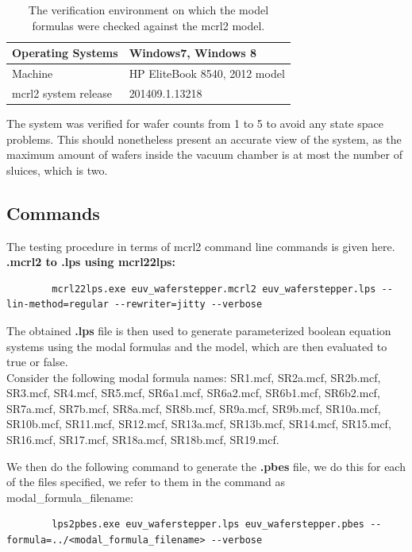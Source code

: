\documentclass[12pt]{report}
\begin{document}
    \begin{table}[!h]
        \centering
        \begin{tabular}{|l|l|}
        \hline
            Operating Systems    & Windows7, Windows 8           \\ \hline
            Machine              & HP EliteBook 8540, 2012 model \\ \hline
            mcrl2 system release & 201409.1.13218 \\
            \hline
        \end{tabular}
        \caption{The verification environment on which the model formulas were checked against the mcrl2 model.}
        \label{ver-en}
    \end{table}

	The system was verified for wafer counts from 1 to 5 to avoid any state space problems. This should nonetheless present an accurate view of the system, as the maximum amount of wafers inside the vacuum chamber is at most the number of sluices, which is two.

    \subsection{Commands}
	The testing procedure in terms of mcrl2 command line commands is given here.\\

    \textbf{.mcrl2 to .lps using mcrl22lps:}\\
    \begin{lstlisting}
        mcrl22lps.exe euv_waferstepper.mcrl2 euv_waferstepper.lps --lin-method=regular --rewriter=jitty --verbose
    \end{lstlisting}
    
    The obtained \textbf{.lps} file is then used to generate parameterized boolean equation systems using the modal formulas and the model, which are then evaluated to true or false.\\
    Consider the following modal formula names: SR1.mcf, SR2a.mcf, SR2b.mcf, SR3.mcf, SR4.mcf, SR5.mcf, SR6a1.mcf, SR6a2.mcf, SR6b1.mcf, SR6b2.mcf, SR7a.mcf, SR7b.mcf, SR8a.mcf, SR8b.mcf, SR9a.mcf, SR9b.mcf, SR10a.mcf, SR10b.mcf, SR11.mcf, SR12.mcf, SR13a.mcf, SR13b.mcf, SR14.mcf, SR15.mcf, SR16.mcf, SR17.mcf, SR18a.mcf, SR18b.mcf, SR19.mcf.
    
    We then do the following command to generate the \textbf{.pbes} file, we do this for each of the files specified, we refer to them in the command as modal\_formula\_filename:\\
     \begin{lstlisting}
        lps2pbes.exe euv_waferstepper.lps euv_waferstepper.pbes --formula=../<modal_formula_filename> --verbose
    \end{lstlisting}   
    
\end{document}
